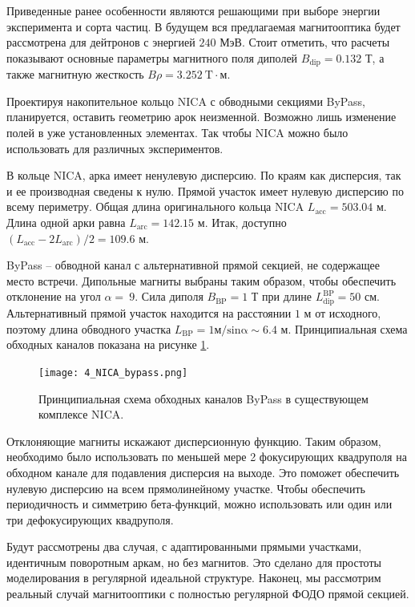\par Приведенные ранее особенности являются решающими при выборе энергии эксперимента и сорта частиц. В будущем вся предлагаемая магнитооптика будет рассмотрена для дейтронов с энергией $240$ МэВ. Стоит отметить, что расчеты показывают основные параметры магнитного поля диполей $B_{\textrm{dip}}=0.132$ Т, а также магнитную жесткость $B\rho=3.252 \ \textrm{T} \cdot$м.

\par Проектируя накопительное кольцо NICA с обводными секциями ByPass, планируется, оставить геометрию арок неизменной. Возможно лишь изменение полей в уже установленных элементах. Так чтобы NICA можно было использовать для различных экспериментов.

\par В кольце NICA, арка имеет ненулевую дисперсию. По краям как дисперсия, так и ее производная сведены к нулю. Прямой участок имеет нулевую дисперсию по всему периметру. Общая длина оригинального кольца NICA $L_{\textrm{acc}}=503.04$ м. Длина одной арки равна $L_{\textrm{arc}}=142.15$ м. Итак, доступно $\left(L_{\textrm{acc}}-2L_{\textrm{arc}}\right)/2=109.6$ м. 
\par ByPass – обводной канал с альтернативной прямой секцией, не содержащее место встречи. Дипольные магниты выбраны таким образом, чтобы обеспечить отклонение на угол $\alpha=\ 9$. Сила диполя $B_{\textrm{BP}}=1$ Т при длине $L_{\textrm{dip}}^{\textrm{BP}}=50$ см. Альтернативный прямой участок находится на расстоянии $1$ м от исходного, поэтому длина обводного участка $L_{\textrm{BP}}=1\mathrm{м/sin\alpha}\sim6.4$ м. Принципиальная схема обходных каналов показана на рисунке \ref{fig:4_NICA_bypass}.

\begin{figure}[!h]
  \centering
   \texttt{[image: 4\_NICA\_bypass.png]}
   \caption{Принципиальная схема обходных каналов ByPass в существующем комплексе NICA.}
   \label{fig:4_NICA_bypass}
\end{figure}

\par Отклоняющие магниты искажают дисперсионную функцию. Таким образом, необходимо было использовать по меньшей мере 2 фокусирующих квадруполя на обходном канале для подавления дисперсия на выходе. Это поможет обеспечить нулевую дисперсию на всем прямолинейному участке. Чтобы обеспечить периодичность и симметрию бета-функций, можно использовать или один или три дефокусирующих квадруполя.
\par Будут рассмотрены два случая, с адаптированными прямыми участками, идентичным поворотным аркам, но без магнитов. Это сделано для простоты моделирования в регулярной идеальной структуре. Наконец, мы рассмотрим реальный случай магнитооптики с полностью регулярной ФОДО прямой секцией.

